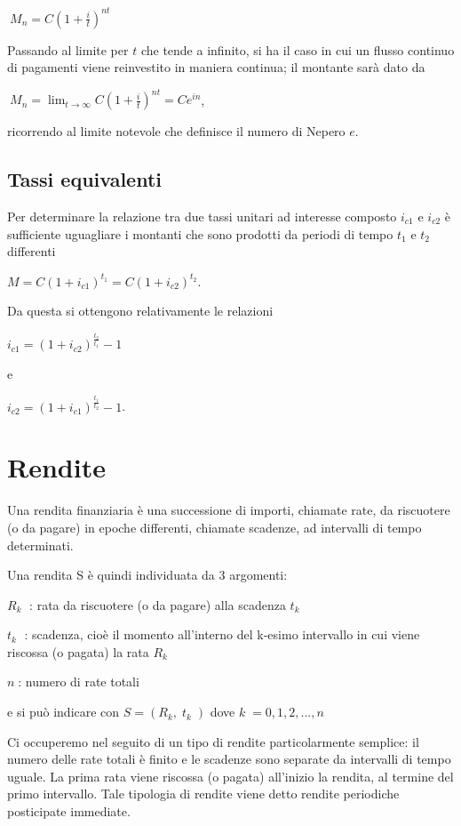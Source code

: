 $\ M_n=C\left(1+\frac{i}{t}\right)^{nt}$

Passando al limite per $t$ che tende a infinito, si ha il caso in cui un flusso 
continuo di pagamenti viene reinvestito in maniera continua; il montante sarà 
dato da

$\ M_n = \lim_{t\to\infty} C\left(1+\frac{i}{t}\right)^{nt} = Ce^{in}$,

ricorrendo al limite notevole che definisce il numero di Nepero $e$.

\subsection{Tassi equivalenti}

Per determinare la relazione tra due tassi unitari ad interesse composto 
$i_{c1}$ e $i_{c2}$ è sufficiente uguagliare i montanti che sono prodotti da 
periodi di tempo $t_1$ e $t_2$ differenti

$M = C(1+i_{c1})^{t_1} = C(1+i_{c2})^{t_2}$.

Da questa si ottengono relativamente le relazioni

$i_{c1} = (1+i_{c2})^\frac{t_2}{t_1}-1$

e

$i_{c2} = (1+i_{c1})^\frac{t_1}{t_2}-1$.


\section{Rendite}
Una rendita finanziaria è una successione di importi, chiamate rate, da 
riscuotere (o da pagare) in epoche differenti, chiamate scadenze, ad intervalli 
di tempo determinati. 

Una rendita S è quindi individuata da 3 argomenti:

\begin {description} [noitemsep]
\item $R_k\;$ : rata da riscuotere (o da pagare) alla scadenza $t_k\;$
\item $t_k\;$ : scadenza, cioè il momento all'interno del k-esimo intervallo in 
cui viene riscossa (o pagata) la rata $R_k\;$
\item $n\;$: numero di rate totali
\end{description}

e si può indicare con $ S= ( R_k , \; t_k\;)$  dove $ k \;=0,1,2,...,n$

Ci occuperemo nel seguito di un tipo di rendite particolarmente semplice:
il numero delle rate totali è finito e le scadenze sono separate da intervalli 
di tempo uguale. La prima rata viene riscossa (o pagata) all'inizio la rendita, 
al termine del primo intervallo. Tale tipologia di rendite viene detto rendite 
periodiche posticipate immediate.

